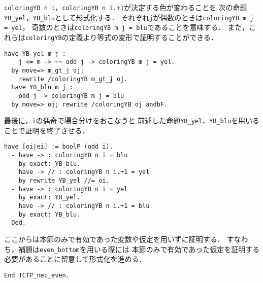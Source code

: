 {\tt{coloringYB n i}}，{\tt{coloringYB n i.+1}}が決定する色が変わることを
次の命題{\tt{YB\_yel}}，{\tt{YB\_blu}}として形式化する．
それぞれ{\tt{j}}が偶数のときは{\tt{coloringYB m j = yel}}，
奇数のときは{\tt{coloringYB m j = blu}}であることを意味する．
また，これらは{\tt{coloringYB}}の定義より等式の変形で証明することができる．
\begin{lstlisting}[language=Coq]
  have YB_yel m j :
    j <= m -> ~~ odd j -> coloringYB m j = yel.
  by move=> m_gt_j oj;
    rewrite /coloringYB m_gt_j oj.
  have YB_blu m j :
    odd j -> coloringYB m j = blu
  by move=> oj; rewrite /coloringYB oj andbF.
\end{lstlisting}
最後に，{\tt{i}}の偶奇で場合分けをおこなうと
前述した命題{\tt{YB\_yel}}，{\tt{YB\_blu}}を用いることで証明を終了させる．
\begin{lstlisting}[language=Coq]
  have [oi|ei] := boolP (odd i).
  - have -> : coloringYB n i = blu
    by exact: YB_blu.
    have -> // : coloringYB n i.+1 = yel
    by rewrite YB_yel //= oi.
  - have -> : coloringYB n i = yel
    by exact: YB_yel.
    have -> // : coloringYB n i.+1 = blu
    by exact: YB_blu.
  Qed.
\end{lstlisting}

ここからは本節のみで有効であった変数や仮定を用いずに証明する．
すなわち，補題は{\tt{even\_bottom}}を用いる際には
本節のみで有効であった仮定を証明する必要があることに留意して形式化を進める．
\begin{lstlisting}[language=Coq]
  End TCTP_nec_even.
\end{lstlisting}

